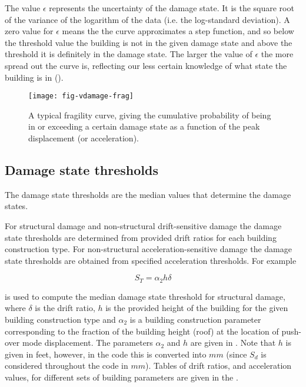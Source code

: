 The value $\epsilon$ represents the uncertainty of the damage
state. It is the square root of the variance of the logarithm of
the data (i.e. the log-standard deviation). A zero value for
$\epsilon$ means the the curve approximates a step function, and
so below the threshold value the building is not in the given
damage state and above the threshold it is definitely in the
damage state. The larger the value of $\epsilon$ the more spread
out the curve is, reflecting our less certain knowledge of what
state the building is in ().


\begin{figure}[htp]
\label{fig:dam-fragility-var-dstate} \centering
{}
 
\texttt{[image: fig-vdamage-frag]}
\caption{A typical fragility curve, giving
the cumulative probability of
  being in or exceeding
  a certain damage state as a function of the
 peak displacement (or acceleration).}
\label{fig:vdamage-frag}
\end{figure}

\subsection{Damage state thresholds}

The damage state thresholds are the median values that determine the
damage states.

For structural damage and non-structural drift-sensitive damage
the damage state thresholds are determined from provided drift
ratios for each building construction type. For non-structural
acceleration-sensitive damage the damage state thresholds are
obtained from specified acceleration thresholds. For example

\begin{equation}
\label{eq:damage-dstate}
 S_T = \alpha_2 h\delta
\end{equation}

is used to compute the median damage state threshold for
structural damage, where $\delta$ is the drift ratio, $h$ is the
provided height of the building for the given building
construction type and $\alpha_2$ is a building construction
parameter corresponding to the fraction of the building height
(roof) at the location of push-over mode displacement. The
parameters $\alpha_2$ and $h$ are given in
. Note that $h$ is given in
feet, however, in the code this is converted into $mm$ (since
$S_d$ is considered throughout the code in $mm$). Tables of drift
ratios, and acceleration values, for different sets of building
parameters are given in the .


